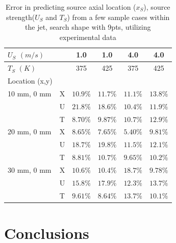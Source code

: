 \documentclass[preprint,12pt]{elsarticle}
\begin{document}
\begin{table}[!h!t!b!p]
\begin{center}
\begin{tabular}{ l | l c c c c}
\hline
 $U_{S}$ $(m/s)$ & & 1.0 & 1.0 & 4.0 & 4.0 \\ \hline
 $T_S$ $(K)$ & & 375 & 425 & 375 & 425  \\ \hline \hline
 Location (x,y) & \\
 10 mm, 0 mm & X & $10.9\%$ & $11.7\%$ & $11.1\%$ & $13.8\%$ \\
 			 & U & $21.8\%$ & $18.6\%$ & $10.4\%$ & $11.9\%$ \\
 			 & T & $8.70\%$ & $9.87\%$ & $10.7\%$ & $12.9\%$ \\ \hline
 20 mm, 0 mm & X & $8.65\%$ & $7.65\%$ & $5.40\%$ & $9.81\%$ \\
 			 & U & $18.7\%$ & $19.8\%$ & $11.5\%$ & $12.1\%$ \\
 			 & T & $8.81\%$ & $10.7\%$ & $9.65\%$ & $10.2\%$ \\ \hline
 30 mm, 0 mm & X & $10.6\%$ & $10.4\%$ & $18.7\%$ & $9.78\%$ \\
 			 & U & $15.8\%$ & $17.9\%$ & $12.3\%$ & $13.7\%$ \\
 			 & T & $9.61\%$ & $8.64\%$ & $13.7\%$ & $10.1\%$ \\ \hline			 
 \end{tabular}
\caption{Error in predicting source axial location ($x_S$), source strength($U_S$ and $T_S$) from a few sample cases within the jet, search shape with 9pts, utilizing experimental data}
\label{tab:typejetF}
\end{center}
\end{table}

\section{Conclusions}

\appendix

{}

\end{document}
